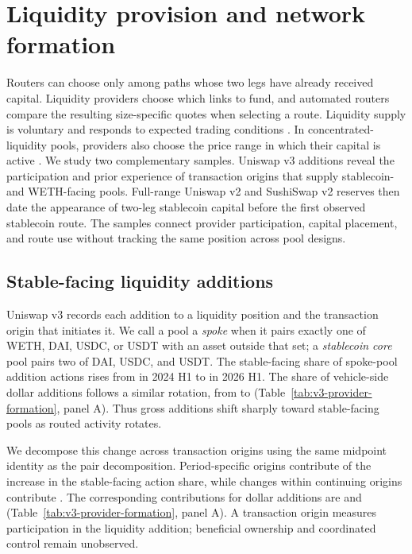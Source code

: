 \section{Liquidity provision and network formation}
\label{sec:liquidity}

Routers can choose only among paths whose two legs have already received capital. Liquidity providers choose which links to fund, and automated routers compare the resulting size-specific quotes when selecting a route. Liquidity supply is voluntary and responds to expected trading conditions \citep{LiWangYe2021WhoProvides}. In concentrated-liquidity pools, providers also choose the price range in which their capital is active \citep{LeharParlour2024Uniswap}. We study two complementary samples. Uniswap v3 additions reveal the participation and prior experience of transaction origins that supply stablecoin- and WETH-facing pools. Full-range Uniswap v2 and SushiSwap v2 reserves then date the appearance of two-leg stablecoin capital before the first observed stablecoin route. The samples connect provider participation, capital placement, and route use without tracking the same position across pool designs.

\subsection{Stable-facing liquidity additions}
\label{sec:liquidity:providers}

Uniswap v3 records each addition to a liquidity position and the transaction origin that initiates it. We call a pool a \emph{spoke} when it pairs exactly one of WETH, DAI, USDC, or USDT with an asset outside that set; a \emph{stablecoin core} pool pairs two of DAI, USDC, and USDT. The stable-facing share of spoke-pool addition actions rises from \VThreeLPAddActionBaselineStableShare{} in 2024 H1 to \VThreeLPAddActionComparisonStableShare{} in 2026 H1. The share of vehicle-side dollar additions follows a similar rotation, from \VThreeLPUSDFlowBaselineStableShare{} to \VThreeLPUSDFlowComparisonStableShare{} (Table~\ref{tab:v3-provider-formation}, panel A). Thus gross additions shift sharply toward stable-facing pools as routed activity rotates.

We decompose this change across transaction origins using the same midpoint identity as the pair decomposition. Period-specific origins contribute \VThreeLPAddActionPeriodSpecificOrigins{} of the \VThreeLPAddActionStableShareChange{} increase in the stable-facing action share, while changes within continuing origins contribute \VThreeLPAddActionWithinContinuingOrigins{}. The corresponding contributions for dollar additions are \VThreeLPUSDFlowPeriodSpecificOrigins{} and \VThreeLPUSDFlowWithinContinuingOrigins{} (Table~\ref{tab:v3-provider-formation}, panel A). A transaction origin measures participation in the liquidity addition; beneficial ownership and coordinated control remain unobserved.

